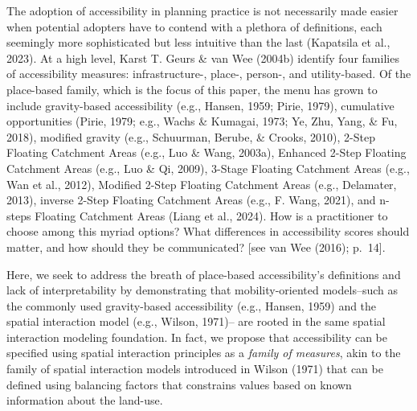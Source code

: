 \documentclass[
11pt, %
oneside, %
english, %
singlespacing, %
]{macthesis} %
\begin{document}
The adoption of accessibility in planning practice is not necessarily made easier when potential adopters have to contend with a plethora of definitions, each seemingly more sophisticated but less intuitive than the last (Kapatsila et al., 2023). At a high level, Karst T. Geurs \& van Wee (2004b) identify four families of accessibility measures: infrastructure-, place-, person-, and utility-based. Of the place-based family, which is the focus of this paper, the menu has grown to include gravity-based accessibility (e.g., Hansen, 1959; Pirie, 1979), cumulative opportunities (Pirie, 1979; e.g., Wachs \& Kumagai, 1973; Ye, Zhu, Yang, \& Fu, 2018), modified gravity (e.g., Schuurman, Berube, \& Crooks, 2010), 2-Step Floating Catchment Areas (e.g., Luo \& Wang, 2003a), Enhanced 2-Step Floating Catchment Areas (e.g., Luo \& Qi, 2009), 3-Stage Floating Catchment Areas (e.g., Wan et al., 2012), Modified 2-Step Floating Catchment Areas (e.g., Delamater, 2013), inverse 2-Step Floating Catchment Areas (e.g., F. Wang, 2021), and n-steps Floating Catchment Areas (Liang et al., 2024). How is a practitioner to choose among this myriad options? What differences in accessibility scores should matter, and how should they be communicated? {[}see van Wee (2016); p.~14{]}.

Here, we seek to address the breath of place-based accessibility's definitions and lack of interpretability by demonstrating that mobility-oriented models--such as the commonly used gravity-based accessibility (e.g., Hansen, 1959) and the spatial interaction model (e.g., Wilson, 1971)-- are rooted in the same spatial interaction modeling foundation. In fact, we propose that accessibility can be specified using spatial interaction principles as a \emph{family of measures}, akin to the family of spatial interaction models introduced in Wilson (1971) that can be defined using balancing factors that constrains values based on known information about the land-use.
\end{document}
